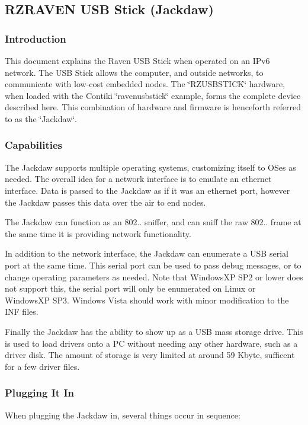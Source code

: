 \hypertarget{a00053}{\subsection{\-R\-Z\-R\-A\-V\-E\-N \-U\-S\-B \-Stick (\-Jackdaw)}
\label{a00053}
}
\hypertarget{a00058_introduction}{}\subsubsection{\-Introduction}\label{a00058_introduction}
\-This document explains the \-Raven \-U\-S\-B \-Stick when operated on an \-I\-Pv6 network. \-The \-U\-S\-B \-Stick allows the computer, and outside networks, to communicate with low-\/cost embedded nodes. \-The \char`\"{}\-R\-Z\-U\-S\-B\-S\-T\-I\-C\-K\char`\"{} hardware, when loaded with the \-Contiki \char`\"{}ravenusbstick\char`\"{} example, forms the complete device described here. \-This combination of hardware and firmware is henceforth referred to as the \char`\"{}\-Jackdaw\char`\"{}.\hypertarget{a00053_capabilities}{}\subsubsection{\-Capabilities}\label{a00053_capabilities}
\-The \-Jackdaw supports multiple operating systems, customizing itself to \-O\-Ses as needed. \-The overall idea for a network interface is to emulate an ethernet interface. \-Data is passed to the \-Jackdaw as if it was an ethernet port, however the \-Jackdaw passes this data over the air to end nodes.

\-The \-Jackdaw can function as an 802.. sniffer, and can sniff the raw 802.. frame at the same time it is providing network functionality.

\-In addition to the network interface, the \-Jackdaw can enumerate a \-U\-S\-B serial port at the same time. \-This serial port can be used to pass debug messages, or to change operating parameters as needed. \-Note that \-Windows\-X\-P \-S\-P2 or lower does not support this, the serial port will only be enumerated on \-Linux or \-Windows\-X\-P \-S\-P3. \-Windows \-Vista should work with minor modification to the \-I\-N\-F files.

\-Finally the \-Jackdaw has the ability to show up as a \-U\-S\-B mass storage drive. \-This is used to load drivers onto a \-P\-C without needing any other hardware, such as a driver disk. \-The amount of storage is very limited at around 59 \-Kbyte, sufficent for a few driver files.\hypertarget{a00053_pluging}{}\subsubsection{\-Plugging It In}\label{a00053_pluging}
\-When plugging the \-Jackdaw in, several things occur in sequence\-:


